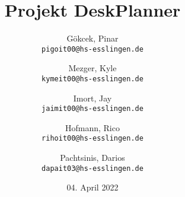 \documentclass[
    12pt,
    headings=big,
    version=first,
    ngerman,
    a4paper,
    BCOR=5mm,
    DIV=14,
    1headlines,
    pagesize,
    oneside,
    openright,
    titlepage,
    headsepline,
    chapterprefix=false,
    bibliography=totoc,
    toc=graduated,
    listof=graduated,
    numbers=noenddot,
    cleardoublepage=empty,
    fleqn,
    parskip=half,
]{scrbook}
\title{Projekt DeskPlanner}
\author{
Gökcek, Pinar\\
\texttt{pigoit00@hs-esslingen.de}
\and
Mezger, Kyle\\
\texttt{kymeit00@hs-esslingen.de}
\and
Imort, Jay\\
\texttt{jaimit00@hs-esslingen.de}
\and
Hofmann, Rico\\
\texttt{rihoit00@hs-esslingen.de}
\and
Pachtsinis, Darios\\
\texttt{dapait03@hs-esslingen.de}
}
\date{04. April 2022}
\begin{document}
\begin{titlepage}
    \centering
    \maketitle

    \thispagestyle{empty}

    \vfill

\end{titlepage}

\tableofcontents

\pagebreak

% 










% 


\end{document}
